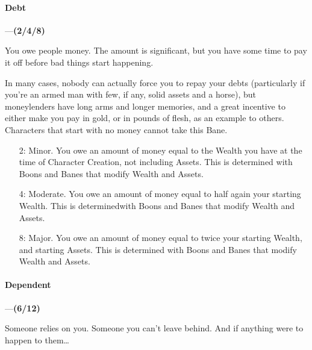 \documentclass[oneside,11pt,english]{book}
\begin{document}
\paragraph{\label{bane:Debt}Debt}---\quad\textbf{(2/4/8) }\par
You owe people money. The amount is significant, but you have some time to pay it off before bad things 
start happening. 


In many cases, nobody can actually force you to repay your debts (particularly if you're an armed man 
with few, if any, solid assets and a horse), but moneylenders have long arms and longer memories, and a 
great incentive to either make you pay in gold, or in pounds of flesh, as an example to others. Characters 
that start with no money cannot take this Bane. 
\begin{itemize}
\item [2:] Minor. You owe an amount of money equal to the Wealth you have at the
  time of Character Creation, not including Assets. This is determined with
  Boons and Banes that modify Wealth and Assets.  
\item [4:] Moderate. You owe an amount of money equal to half again your starting Wealth. This is determinedwith Boons and Banes that modify Wealth and Assets. 
\item [8:] Major. You owe an amount of money equal to twice your starting
  Wealth, and starting Assets. This is determined with Boons and Banes that
  modify Wealth and Assets. 
\end{itemize}
\paragraph{\label{bane:Dependent}Dependent}---\quad\textbf{(6/12) }\par
Someone relies on you. Someone you can’t leave behind. And if anything were to happen to them…
\end{document}
